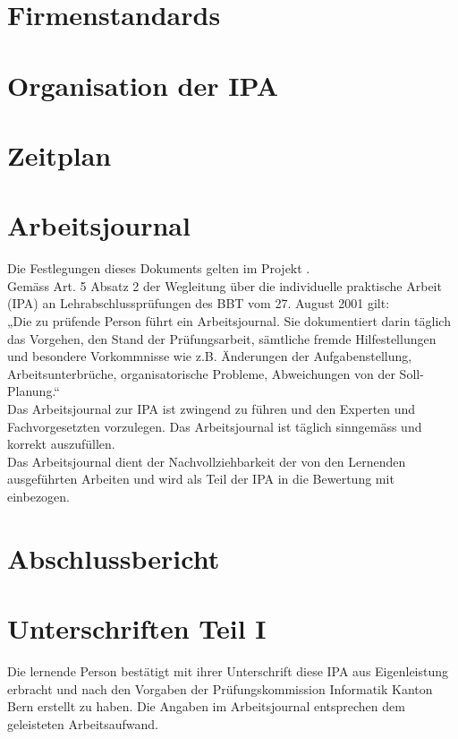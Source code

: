 \documentclass[a4paper,11pt,oneside]{report}
\begin{document}
\chapter{Firmenstandards}


\chapter{Organisation der IPA}
\nopagebreak


\chapter{Zeitplan}


\chapter{Arbeitsjournal}
Die Festlegungen dieses Dokuments gelten im Projekt .\\
Gemäss Art. 5 Absatz 2 der Wegleitung über die individuelle praktische Arbeit (IPA) an Lehrabschlussprüfungen des BBT vom 27. August 2001 gilt:\\
„Die zu prüfende Person führt ein Arbeitsjournal. Sie dokumentiert darin täglich das Vorgehen, den Stand der Prüfungsarbeit, sämtliche fremde Hilfestellungen und besondere Vorkommnisse wie z.B. Änderungen der Aufgabenstellung, Arbeitsunterbrüche, organisatorische Probleme, Abweichungen von der Soll-Planung.“\\
Das Arbeitsjournal zur IPA ist zwingend zu führen und den Experten und Fachvorgesetzten vorzulegen. Das Arbeitsjournal ist täglich sinngemäss und korrekt auszufüllen.\\
Das Arbeitsjournal dient der Nachvollziehbarkeit der von den Lernenden ausgeführten Arbeiten und wird als Teil der IPA in die Bewertung mit einbezogen.
\newpage


\chapter{Abschlussbericht}


\chapter{Unterschriften Teil I}
Die lernende Person bestätigt mit ihrer Unterschrift diese IPA aus Eigenleistung erbracht und nach den Vorgaben der Prüfungskommission Informatik Kanton Bern erstellt zu haben. Die Angaben im Arbeitsjournal entsprechen dem geleisteten Arbeitsaufwand.\\
\end{document}
